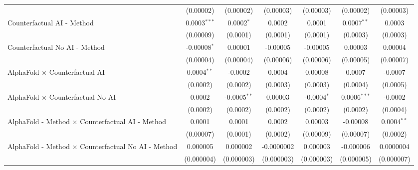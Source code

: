 \begin{tabular}{lcccccc}
                                                              & (0.00002)      & (0.00002)       & (0.00003)      & (0.00003)     & (0.00002)      & (0.00003)\\   
   Counterfactual AI - Method                                 & 0.0003$^{***}$ & 0.0002$^{*}$    & 0.0002         & 0.0001        & 0.0007$^{**}$  & 0.0003\\   
                                                              & (0.00009)      & (0.0001)        & (0.0001)       & (0.0001)      & (0.0003)       & (0.0003)\\   
   Counterfactual No AI - Method                              & -0.00008$^{*}$ & 0.00001         & -0.00005       & -0.00005      & 0.00003        & 0.00004\\   
                                                              & (0.00004)      & (0.00004)       & (0.00006)      & (0.00006)     & (0.00005)      & (0.00007)\\   
   AlphaFold $\times$ Counterfactual AI                       & 0.0004$^{**}$  & -0.0002         & 0.0004         & 0.00008       & 0.0007         & -0.0007\\   
                                                              & (0.0002)       & (0.0002)        & (0.0003)       & (0.0003)      & (0.0004)       & (0.0005)\\   
   AlphaFold $\times$ Counterfactual No AI                    & 0.0002         & -0.0005$^{**}$  & 0.00003        & -0.0004$^{*}$ & 0.0006$^{***}$ & -0.0002\\   
                                                              & (0.0002)       & (0.0002)        & (0.0002)       & (0.0002)      & (0.0002)       & (0.0004)\\   
   AlphaFold - Method $\times$ Counterfactual AI - Method     & 0.0001         & 0.0001          & 0.0002         & 0.00003       & -0.00008       & 0.0004$^{**}$\\   
                                                              & (0.00007)      & (0.0001)        & (0.0002)       & (0.00009)     & (0.00007)      & (0.0002)\\   
   AlphaFold - Method $\times$ Counterfactual No AI - Method  & 0.000005       & 0.000002        & -0.0000002     & 0.000003      & -0.000006      & 0.0000004\\   
                                                              & (0.000004)     & (0.000003)      & (0.000003)     & (0.000003)    & (0.000005)     & (0.000007)\\   

\end{tabular}
